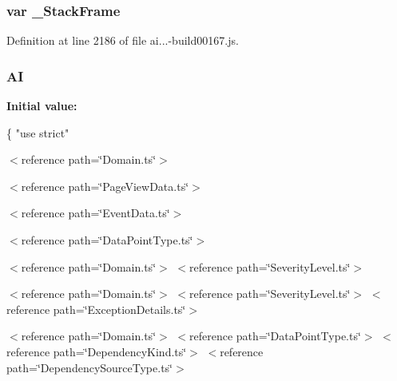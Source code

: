 \subsubsection[{\texorpdfstring{\+\_\+\+Stack\+Frame}{_StackFrame}}]{\setlength{\rightskip}{0pt plus 5cm}var \+\_\+\+Stack\+Frame}\hypertarget{obj_2_release_2_package_2_package_tmp_2_scripts_2ai_80_822_89-build00167_8js_a5929f1dacfa37e45fcd288d6a2cde2e6}{}\label{obj_2_release_2_package_2_package_tmp_2_scripts_2ai_80_822_89-build00167_8js_a5929f1dacfa37e45fcd288d6a2cde2e6}


Definition at line 2186 of file ai...-\/build00167.\+js.

\subsubsection[{\texorpdfstring{AI}{AI}}]{\setlength{\rightskip}{0pt plus 5cm}AI}\hypertarget{obj_2_release_2_package_2_package_tmp_2_scripts_2ai_80_822_89-build00167_8js_aa840f97564574b54956c385088b90e81}{}\label{obj_2_release_2_package_2_package_tmp_2_scripts_2ai_80_822_89-build00167_8js_aa840f97564574b54956c385088b90e81}
{\bfseries Initial value\+:}
\begin{DoxyCode}
\{
    \textcolor{stringliteral}{"use strict"}
\end{DoxyCode}


$<$reference path=\char`\"{}\+Domain.\+ts\char`\"{}$>$ 

$<$reference path=\char`\"{}\+Page\+View\+Data.\+ts\char`\"{}$>$

$<$reference path=\char`\"{}\+Event\+Data.\+ts\char`\"{}$>$

$<$reference path=\char`\"{}\+Data\+Point\+Type.\+ts\char`\"{}$>$

$<$reference path=\char`\"{}\+Domain.\+ts\char`\"{}$>$ $<$reference path=\char`\"{}\+Severity\+Level.\+ts\char`\"{}$>$

$<$reference path=\char`\"{}\+Domain.\+ts\char`\"{}$>$ $<$reference path=\char`\"{}\+Severity\+Level.\+ts\char`\"{}$>$ $<$reference path=\char`\"{}\+Exception\+Details.\+ts\char`\"{}$>$

$<$reference path=\char`\"{}\+Domain.\+ts\char`\"{}$>$ $<$reference path=\char`\"{}\+Data\+Point\+Type.\+ts\char`\"{}$>$ $<$reference path=\char`\"{}\+Dependency\+Kind.\+ts\char`\"{}$>$ $<$reference path=\char`\"{}\+Dependency\+Source\+Type.\+ts\char`\"{}$>$

